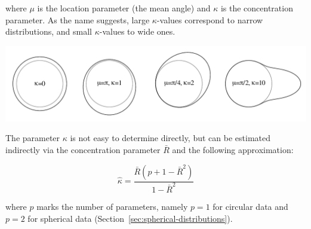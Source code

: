 \noindent where $\mu$ is the location parameter (the mean angle) and
$\kappa$ is the concentration parameter. As the name suggests, large
$\kappa$-values correspond to narrow distributions, and small
$\kappa$-values to wide ones.

\noindent\includegraphics[width=\textwidth]{../figures/vonMises.pdf}
\begingroup {}
\label{fig:vonMises}\endgroup

The parameter $\kappa$ is not easy to determine directly, but can be
estimated indirectly via the concentration parameter $\bar{R}$ and the
following approximation:

\begin{equation}
  \hat{\kappa} = \frac{\bar{R}(p+1-\bar{R}^2)}{1-\bar{R}^2}
  \label{eq:kappa}
\end{equation}

\noindent where $p$ marks the number of parameters, namely $p=1$ for
circular data and $p=2$ for spherical data
(Section~\ref{sec:spherical-distributions}).

